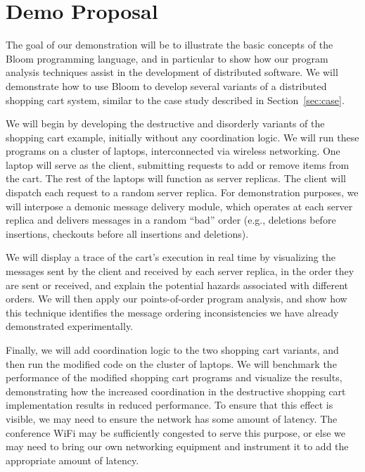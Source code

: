 \clearpage
\section{Demo Proposal}
\label{sec:demo}

The goal of our demonstration will be to illustrate the basic concepts of the
Bloom programming language, and in particular to show how our program analysis
techniques assist in the development of distributed software. We will
demonstrate how to use Bloom to develop several variants of a distributed
shopping cart system, similar to the case study described in
Section~\ref{sec:case}.

We will begin by developing the destructive and disorderly variants of the
shopping cart example, initially without any coordination logic. We will run
these programs on a cluster of laptops, interconnected via wireless
networking. One laptop will serve as the client, submitting requests to add or
remove items from the cart.  The rest of the laptops will function as server
replicas.  The client will dispatch each request to a random server replica.
For demonstration purposes, we will interpose a demonic message delivery module,
which operates at each server replica and delivers messages in a random ``bad''
order (e.g., deletions before insertions, checkouts before all insertions
and deletions).

We will display a trace of the cart's execution in real time by visualizing the
messages sent by the client and received by each server replica, in the order
they are sent or received, and explain the potential hazards associated with
different orders. We will then apply our points-of-order program analysis, and
show how this technique identifies the message ordering inconsistencies we have
already demonstrated experimentally.

Finally, we will add coordination logic to the two shopping cart variants, and
then run the modified code on the cluster of laptops. We will benchmark the
performance of the modified shopping cart programs and visualize the results,
demonstrating how the increased coordination in the destructive shopping cart
implementation results in reduced performance. To ensure that this effect is
visible, we may need to ensure the network has some amount of latency. The
conference WiFi may be sufficiently congested to serve this purpose, or else we
may need to bring our own networking equipment and instrument it to add the
appropriate amount of latency.
